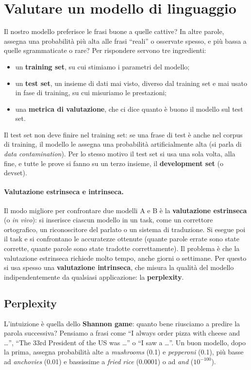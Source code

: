 \section{Valutare un modello di linguaggio}
Il nostro modello preferisce le frasi buone a quelle cattive? In altre parole, assegna una probabilità più alta alle frasi \enquote{reali} o osservate spesso, e più bassa a quelle sgrammaticate o rare? Per rispondere servono tre ingredienti:
\begin{itemize}
    \item un \textbf{training set}, su cui stimiamo i parametri del modello;
    \item un \textbf{test set}, un insieme di dati mai visto, diverso dal training set e mai usato in fase di training, su cui misuriamo le prestazioni;
    \item una \textbf{metrica di valutazione}, che ci dice quanto è buono il modello sul test set.
\end{itemize}
Il test set non deve finire nel training set: se una frase di test è anche nel corpus di training, il modello le assegna una probabilità artificialmente alta (si parla di \textit{data contamination}). Per lo stesso motivo il test set si usa una sola volta, alla fine, e tutte le prove si fanno su un terzo insieme, il \textbf{development set} (o devset).

\paragraph{Valutazione estrinseca e intrinseca.} Il modo migliore per confrontare due modelli A e B è la \textbf{valutazione estrinseca} (o \textit{in vivo}): si inserisce ciascun modello in un task, come un correttore ortografico, un riconoscitore del parlato o un sistema di traduzione. Si esegue poi il task e si confrontano le accuratezze ottenute (quante parole errate sono state corrette, quante parole sono state tradotte correttamente). Il problema è che la valutazione estrinseca richiede molto tempo, anche giorni o settimane. Per questo si usa spesso una \textbf{valutazione intrinseca}, che misura la qualità del modello indipendentemente da qualsiasi applicazione: la \textbf{perplexity}.

\subsection{Perplexity}\label{sec:perplexity}
L'intuizione è quella dello \textbf{Shannon game}: quanto bene riusciamo a predire la parola successiva? Pensiamo a frasi come \enquote{I always order pizza with cheese and \dots}, \enquote{The 33rd President of the US was \dots} o \enquote{I saw a \dots}. Un buon modello, dopo la prima, assegna probabilità alte a \textit{mushrooms} (0.1) e \textit{pepperoni} (0.1), più basse ad \textit{anchovies} (0.01) e bassissime a \textit{fried rice} (0.0001) o ad \textit{and} ($10^{-100}$).

